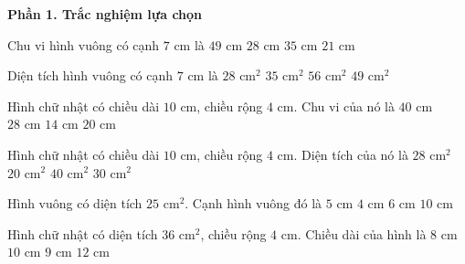 \textbf{Phần 1. Trắc nghiệm lựa chọn}

\begin{ex} %
Chu vi hình vuông có cạnh $7\text{ cm}$ là
\choice
{$49\text{ cm}$}
{\True $28\text{ cm}$}
{$35\text{ cm}$}
{$21\text{ cm}$}
\end{ex}

\begin{ex} %
Diện tích hình vuông có cạnh $7\text{ cm}$ là
\choice
{$28\text{ cm}^2$}
{$35\text{ cm}^2$}
{$56\text{ cm}^2$}
{\True $49\text{ cm}^2$}
\end{ex}

\begin{ex} %
Hình chữ nhật có chiều dài $10\text{ cm}$, chiều rộng $4\text{ cm}$. Chu vi của nó là
\choice
{$40\text{ cm}$}
{\True $28\text{ cm}$}
{$14\text{ cm}$}
{$20\text{ cm}$}
\end{ex}

\begin{ex} %
Hình chữ nhật có chiều dài $10\text{ cm}$, chiều rộng $4\text{ cm}$. Diện tích của nó là
\choice
{$28\text{ cm}^2$}
{$20\text{ cm}^2$}
{\True $40\text{ cm}^2$}
{$30\text{ cm}^2$}
\end{ex}

\begin{ex} %
Hình vuông có diện tích $25\text{ cm}^2$. Cạnh hình vuông đó là
\choice
{\True $5\text{ cm}$}
{$4\text{ cm}$}
{$6\text{ cm}$}
{$10\text{ cm}$}
\end{ex}

\begin{ex} %
Hình chữ nhật có diện tích $36\text{ cm}^2$, chiều rộng $4\text{ cm}$. Chiều dài của hình là
\choice
{$8\text{ cm}$}
{$10\text{ cm}$}
{\True $9\text{ cm}$}
{$12\text{ cm}$}
\end{ex}

